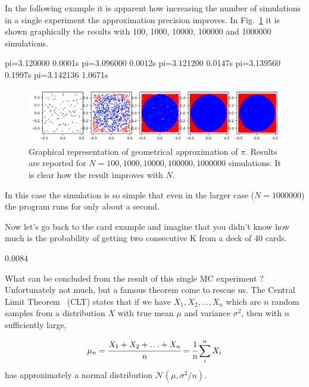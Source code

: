 In the following example it is apparent how increasing the number of simulations in a single experiment the approximation precision improves. In Fig.~\ref{fig:circle_approx} it is shown graphically the results with 100, 1000, 10000, 100000 and 1000000 simulations.

\begin{ioutput}
pi=3.120000 0.0001s
pi=3.096000 0.0012s
pi=3.121200 0.0147s
pi=3.139560 0.1997s
pi=3.142136 1.0671s
\end{ioutput}

\begin{figure}[htb]
\centering
\includegraphics[width=1\textwidth]{figures/mc_vs_n_experiments}
\caption{Graphical representation of geometrical approximation of $\pi$. Results are reported for $N = 100, 1000, 10000, 100000, 1000000$ simulations. It is clear how the result improves with $N$.}
\label{fig:circle_approx}
\end{figure}

In this case the simulation is so simple that even in the larger case ($N=1000000$) the program runs for only about a second.

Now let's go back to the card example and imagine that you didn't know how much is the probability of getting two consecutive K from a deck of 40 cards. 

\begin{ioutput}
0.0084
\end{ioutput}

What can be concluded from the result of this single MC experiment ? Unfortunately not much, but a famous theorem come to rescue us.
The Central Limit Theorem~\cite{bib:central_limit} (CLT) states that if we have $X_1, X_2,\dots, X_n$ which are $n$ random samples from a distribution $X$ with true mean $\mu$ and variance $\sigma^{2}$, then with $n$ sufficiently large,

\begin{equation*} 
\mu_n = \cfrac{X_1 + X_2 +\ldots + X_n}{n} = \cfrac{1}{n}\sum_i^n X_i
\end{equation*}
has approximately a normal distribution $\mathcal{N}(\mu, \sigma^2/n)$.


